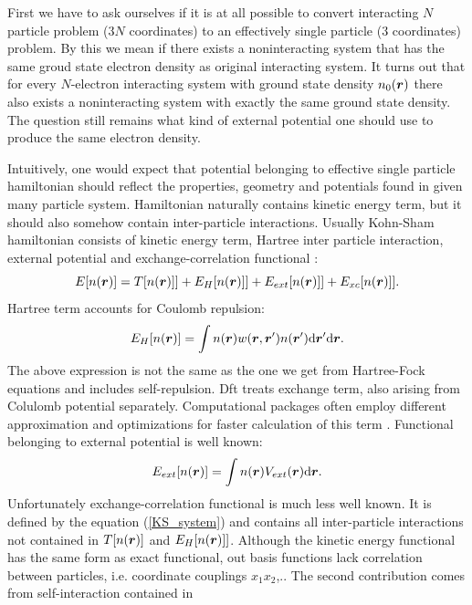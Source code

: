 \documentclass[openany, longbibliography,slovene,a4paper,12pt]{article}
\def\vec#1{\mbox{\boldmath$#1$}}
\newcommand{\dif}{\mathrm{d}}
\begin{document}
First we have to ask ourselves if it is at all possible to convert interacting
$N$ particle problem ($3N$ coordinates) to an effectively single particle (3 coordinates)
problem. By this we mean if there exists a noninteracting system that has the
same groud state electron density as original interacting system. It turns out
that for every $N$-electron interacting system with ground state density
$n_0(\vec r)$ there also exists a noninteracting system with exactly the same
ground state density. The question still remains what kind of external potential
one should use to produce the same electron density.

Intuitively, one would expect that potential belonging to effective single
particle hamiltonian should reflect the properties, geometry and potentials found
in given many particle system. Hamiltonian naturally contains kinetic energy
term, but it should also somehow contain inter-particle interactions. Usually
Kohn-Sham hamiltonian consists of kinetic energy term, Hartree inter particle
interaction, external potential and exchange-correlation functional \cite{advanced_course}:
\begin{equation} \label{KS_system}
  E[n(\vec r)]=T[n(\vec r)]] + E_H[n(\vec r)]] + E_{ext}[n(\vec r)]] + E_{xc}[n(\vec r)]].
\end{equation}
Hartree term accounts for Coulomb repulsion:
\begin{equation} \label{hartree_term1}
  E_H[n(\vec r)] = \int n(\vec r)w(\vec r, \vec r') n(\vec r')\dif \vec r' \dif \vec r.
\end{equation}
The above expression is not the same as the one we get from Hartree-Fock
equations and includes self-repulsion. Dft treats exchange term, also arising
from Colulomb potential separately. Computational packages often employ different
approximation and optimizations for faster calculation of this term \cite{orca}.
Functional belonging to external potential is well known:
\begin{equation} \label{ext_potential_functional}
  E_{ext}[n(\vec r)] = \int n(\vec r) V_{ext}(\vec r) \dif \vec r.
\end{equation}
Unfortunately exchange-correlation functional is much less well known. It is
defined by the equation (\ref{KS_system}) and contains all inter-particle
interactions not contained in $T[n(\vec r)]$ and $ E_H[n(\vec r)]]$. Although
the kinetic energy functional has the same form as exact functional, out basis
functions lack correlation between particles, i.e. coordinate couplings
$x_1x_2$,.. The second contribution comes from self-interaction contained in
\end{document}
